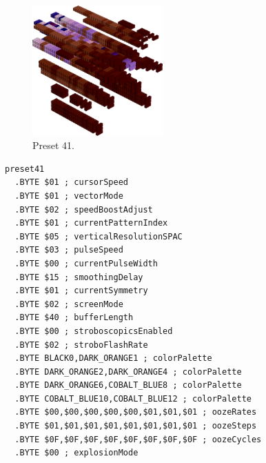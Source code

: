 \vspace*{0.5cm}
\begin{minipage}[b]{0.48\linewidth}
\begin{figure}[H]                                                          
  \centering                                                             
  \begin{adjustbox}{width=5cm,center}                                   
  \includegraphics[width=5cm]{src/colorspace_presets/preset41-45.png}%
  \end{adjustbox}                                                        
\caption*{Preset 41.}                                           
\end{figure}                                                               
\end{minipage}
\hspace{0.1cm}
\begin{minipage}[b]{0.48\linewidth}                                                                         
\begin{lstlisting}[basicstyle=\ttfamily\tiny]
preset41
  .BYTE $01 ; cursorSpeed
  .BYTE $01 ; vectorMode
  .BYTE $02 ; speedBoostAdjust
  .BYTE $01 ; currentPatternIndex
  .BYTE $05 ; verticalResolutionSPAC
  .BYTE $03 ; pulseSpeed
  .BYTE $00 ; currentPulseWidth
  .BYTE $15 ; smoothingDelay
  .BYTE $01 ; currentSymmetry
  .BYTE $02 ; screenMode
  .BYTE $40 ; bufferLength
  .BYTE $00 ; stroboscopicsEnabled
  .BYTE $02 ; stroboFlashRate
  .BYTE BLACK0,DARK_ORANGE1 ; colorPalette
  .BYTE DARK_ORANGE2,DARK_ORANGE4 ; colorPalette
  .BYTE DARK_ORANGE6,COBALT_BLUE8 ; colorPalette
  .BYTE COBALT_BLUE10,COBALT_BLUE12 ; colorPalette
  .BYTE $00,$00,$00,$00,$00,$01,$01,$01 ; oozeRates
  .BYTE $01,$01,$01,$01,$01,$01,$01,$01 ; oozeSteps
  .BYTE $0F,$0F,$0F,$0F,$0F,$0F,$0F,$0F ; oozeCycles
  .BYTE $00 ; explosionMode
\end{lstlisting}
\end{minipage}


